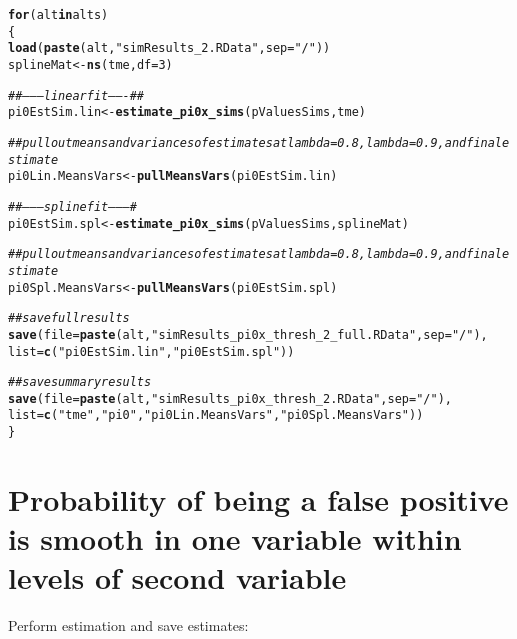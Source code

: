 \documentclass{article}\usepackage[]{graphicx}\usepackage[]{color}
\makeatletter
\newcommand{\hlnum}[1]{\textcolor[rgb]{0.686,0.059,0.569}{#1}}%
\newcommand{\hlstr}[1]{\textcolor[rgb]{0.192,0.494,0.8}{#1}}%
\newcommand{\hlcom}[1]{\textcolor[rgb]{0.678,0.584,0.686}{\textit{#1}}}%
\newcommand{\hlstd}[1]{\textcolor[rgb]{0.345,0.345,0.345}{#1}}%
\newcommand{\hlkwa}[1]{\textcolor[rgb]{0.161,0.373,0.58}{\textbf{#1}}}%
\newcommand{\hlkwb}[1]{\textcolor[rgb]{0.69,0.353,0.396}{#1}}%
\newcommand{\hlkwc}[1]{\textcolor[rgb]{0.333,0.667,0.333}{#1}}%
\newcommand{\hlkwd}[1]{\textcolor[rgb]{0.737,0.353,0.396}{\textbf{#1}}}%
\newenvironment{kframe}{%
 \def\at@end@of@kframe{}%
 \ifinner\ifhmode%
  \def\at@end@of@kframe{\end{minipage}}%
  \begin{minipage}{\columnwidth}%
 \fi\fi%
 \def\FrameCommand##1{\hskip\@totalleftmargin \hskip-\fboxsep
 \colorbox{shadecolor}{##1}\hskip-\fboxsep
     \hskip-\linewidth \hskip-\@totalleftmargin \hskip\columnwidth}%
 \MakeFramed {\advance\hsize-\width
   \@totalleftmargin\z@ \linewidth\hsize
   \@setminipage}}%
 {\par\unskip\endMakeFramed%
 \at@end@of@kframe}
\newenvironment{knitrout}{}{} %
\makeatother
\begin{document}
\begin{knitrout}
\color{fgcolor}\begin{kframe}
\begin{alltt}
\hlkwa{for}\hlstd{(alt} \hlkwa{in} \hlstd{alts)}
\hlstd{\{}
  \hlkwd{load}\hlstd{(}\hlkwd{paste}\hlstd{(alt,}\hlstr{"simResults_2.RData"}\hlstd{,}\hlkwc{sep}\hlstd{=}\hlstr{"/"}\hlstd{))}
  \hlstd{splineMat} \hlkwb{<-} \hlkwd{ns}\hlstd{(tme,}\hlkwc{df}\hlstd{=}\hlnum{3}\hlstd{)}

  \hlcom{##--------linear fit-------##}
  \hlstd{pi0EstSim.lin} \hlkwb{<-} \hlkwd{estimate_pi0x_sims}\hlstd{(pValuesSims, tme)}

  \hlcom{##pull out means and variances of estimates at lambda=0.8, lambda=0.9, and final estimate}
  \hlstd{pi0Lin.MeansVars} \hlkwb{<-} \hlkwd{pullMeansVars}\hlstd{(pi0EstSim.lin)}

  \hlcom{##---------spline fit---------#}
  \hlstd{pi0EstSim.spl} \hlkwb{<-} \hlkwd{estimate_pi0x_sims}\hlstd{(pValuesSims, splineMat)}

  \hlcom{##pull out means and variances of estimates at lambda=0.8, lambda=0.9, and final estimate}
  \hlstd{pi0Spl.MeansVars} \hlkwb{<-} \hlkwd{pullMeansVars}\hlstd{(pi0EstSim.spl)}

  \hlcom{##save full results}
  \hlkwd{save}\hlstd{(}\hlkwc{file}\hlstd{=}\hlkwd{paste}\hlstd{(alt,}\hlstr{"simResults_pi0x_thresh_2_full.RData"}\hlstd{,}\hlkwc{sep}\hlstd{=}\hlstr{"/"}\hlstd{),}
       \hlkwc{list}\hlstd{=}\hlkwd{c}\hlstd{(}\hlstr{"pi0EstSim.lin"}\hlstd{,}\hlstr{"pi0EstSim.spl"}\hlstd{))}

  \hlcom{##save summary results}
  \hlkwd{save}\hlstd{(}\hlkwc{file}\hlstd{=}\hlkwd{paste}\hlstd{(alt,}\hlstr{"simResults_pi0x_thresh_2.RData"}\hlstd{,}\hlkwc{sep}\hlstd{=}\hlstr{"/"}\hlstd{),}
       \hlkwc{list}\hlstd{=}\hlkwd{c}\hlstd{(}\hlstr{"tme"}\hlstd{,} \hlstr{"pi0"}\hlstd{,} \hlstr{"pi0Lin.MeansVars"}\hlstd{,} \hlstr{"pi0Spl.MeansVars"}\hlstd{))}
\hlstd{\}}
\end{alltt}
\end{kframe}
\end{knitrout}

\section{Probability of being a false positive is smooth in one variable within levels of second variable}

Perform estimation and save estimates:
\end{document}
